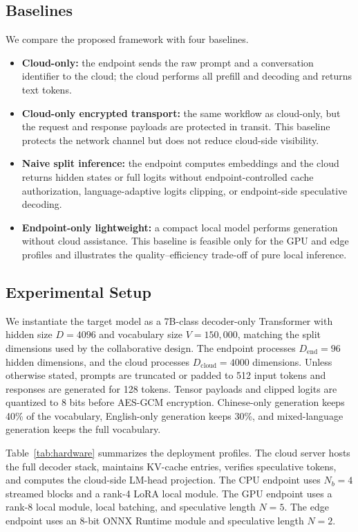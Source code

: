 \documentclass{article}
\newcommand{\End}{\mathrm{end}}
\newcommand{\Cloud}{\mathrm{cloud}}
\begin{document}
\subsection{Baselines}

We compare the proposed framework with four baselines.
\begin{itemize}
  \item \textbf{Cloud-only:} the endpoint sends the raw prompt and a conversation identifier to the cloud; the cloud performs all prefill and decoding and returns text tokens.
  \item \textbf{Cloud-only encrypted transport:} the same workflow as cloud-only, but the request and response payloads are protected in transit. This baseline protects the network channel but does not reduce cloud-side visibility.
  \item \textbf{Naive split inference:} the endpoint computes embeddings and the cloud returns hidden states or full logits without endpoint-controlled cache authorization, language-adaptive logits clipping, or endpoint-side speculative decoding.
  \item \textbf{Endpoint-only lightweight:} a compact local model performs generation without cloud assistance. This baseline is feasible only for the GPU and edge profiles and illustrates the quality--efficiency trade-off of pure local inference.
\end{itemize}

\subsection{Experimental Setup}

We instantiate the target model as a 7B-class decoder-only Transformer with hidden size $D=4096$ and vocabulary size $V=150{,}000$, matching the split dimensions used by the collaborative design. The endpoint processes $D_{\End}=96$ hidden dimensions, and the cloud processes $D_{\Cloud}=4000$ dimensions. Unless otherwise stated, prompts are truncated or padded to 512 input tokens and responses are generated for 128 tokens. Tensor payloads and clipped logits are quantized to 8 bits before AES-GCM encryption. Chinese-only generation keeps 40\% of the vocabulary, English-only generation keeps 30\%, and mixed-language generation keeps the full vocabulary.

Table~\ref{tab:hardware} summarizes the deployment profiles. The cloud server hosts the full decoder stack, maintains KV-cache entries, verifies speculative tokens, and computes the cloud-side LM-head projection. The CPU endpoint uses $N_b=4$ streamed blocks and a rank-4 LoRA local module. The GPU endpoint uses a rank-8 local module, local batching, and speculative length $N=5$. The edge endpoint uses an 8-bit ONNX Runtime module and speculative length $N=2$.
\end{document}
